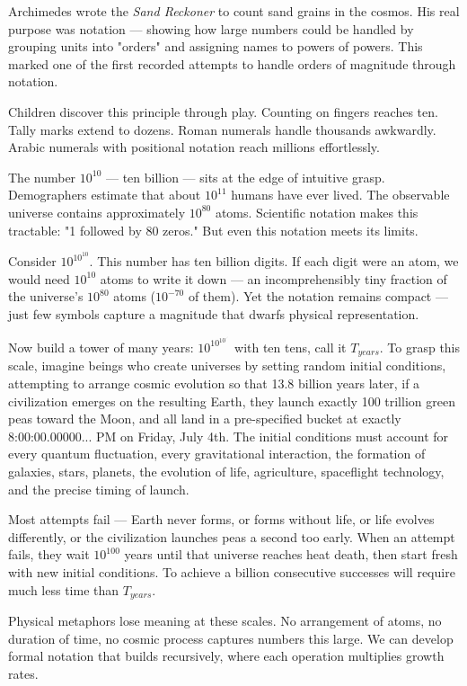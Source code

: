 Archimedes wrote the \emph{Sand Reckoner} to count sand grains in the cosmos. His real purpose was notation — showing how large numbers could be handled by grouping units into "orders" and assigning names to powers of powers. This marked one of the first recorded attempts to handle orders of magnitude through notation.

Children discover this principle through play. Counting on fingers reaches ten. Tally marks extend to dozens. Roman numerals handle thousands awkwardly. Arabic numerals with positional notation reach millions effortlessly.

The number $10^{10}$ — ten billion — sits at the edge of intuitive grasp. Demographers estimate that about $10^{11}$ humans have ever lived. The observable universe contains approximately $10^{80}$ atoms. Scientific notation makes this tractable: "1 followed by 80 zeros." But even this notation meets its limits.

Consider $10^{10^{10}}$. This number has ten billion digits. If each digit were an atom, we would need $10^{10}$ atoms to write it down — an incomprehensibly tiny fraction of the universe's $10^{80}$ atoms ($10^{-70}$ of them). Yet the notation remains compact — just few symbols capture a magnitude that dwarfs physical representation.

Now build a tower of many years: $10^{10^{10^{\cdot^{\cdot^{\cdot}}}}}$ with ten tens, call it $T_{years}$. To grasp this scale, imagine beings who create universes by setting random initial conditions, attempting to arrange cosmic evolution so that 13.8 billion years later, if a civilization emerges on the resulting Earth, they launch exactly 100 trillion green peas toward the Moon, and all land in a pre-specified bucket at exactly 8:00:00.00000... PM on Friday, July 4th. The initial conditions must account for every quantum fluctuation, every gravitational interaction, the formation of galaxies, stars, planets, the evolution of life, agriculture, spaceflight technology, and the precise timing of launch.

Most attempts fail — Earth never forms, or forms without life, or life evolves differently, or the civilization launches peas a second too early. When an attempt fails, they wait $10^{100}$ years until that universe reaches heat death, then start fresh with new initial conditions. To achieve a billion consecutive successes will require much less time than $T_{years}$.

Physical metaphors lose meaning at these scales. No arrangement of atoms, no duration of time, no cosmic process captures numbers this large. We can develop formal notation that builds recursively, where each operation multiplies growth rates.

